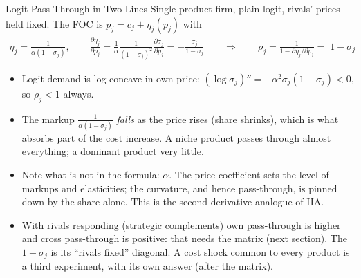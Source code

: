 \documentclass[aspectratio=169,10pt]{beamer}
\begin{document}
\begin{frame}{Logit Pass-Through in Two Lines}
Single-product firm, plain logit, rivals' prices held fixed. The FOC is $p_j = c_j + \eta_j(p_j)$ with
\begin{align*}
\eta_j = \frac{1}{\alpha (1-\sigma_j)}, \qquad \frac{\partial \eta_j}{\partial p_j} = \frac{1}{\alpha}\frac{1}{(1-\sigma_j)^2}\frac{\partial \sigma_j}{\partial p_j} = -\frac{\sigma_j}{1-\sigma_j}
\qquad \Rightarrow \qquad
\rho_j = \frac{1}{1 - \partial \eta_j / \partial p_j} = \boxed{\;1 - \sigma_j\;}
\end{align*}
\begin{itemize}
\item Logit demand is \alert{log-concave} in own price: $(\log \sigma_j)'' = -\alpha^2 \sigma_j (1-\sigma_j) < 0$, so $\rho_j < 1$ always.
\item The markup $\frac{1}{\alpha(1-\sigma_j)}$ \emph{falls} as the price rises (share shrinks), which is what absorbs part of the cost increase. A niche product passes through almost everything; a dominant product very little.
\item Note what is \alert{not} in the formula: $\alpha$. The price coefficient sets the level of markups and elasticities; the curvature, and hence pass-through, is pinned down by the \alert{share alone}. This is the second-derivative analogue of IIA.
\item With rivals responding (strategic complements) own pass-through is higher and cross pass-through is positive: that needs the matrix (next section). The $1-\sigma_j$ is its ``rivals fixed'' diagonal. A cost shock common to \alert{every} product is a third experiment, with its own answer (after the matrix).
\end{itemize}
\end{frame}
\end{document}
